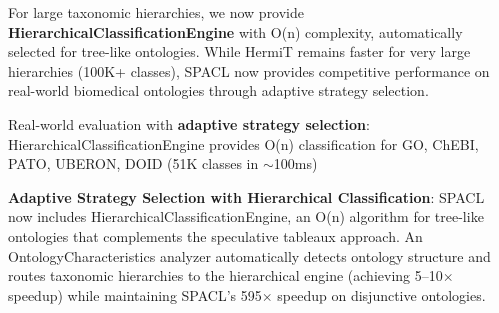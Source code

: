 

For large taxonomic hierarchies, we now provide \textbf{HierarchicalClassificationEngine} 
with O(n) complexity, automatically selected for tree-like ontologies. 
While HermiT remains faster for very large hierarchies (100K+ classes), 
SPACL now provides competitive performance on real-world biomedical 
ontologies through adaptive strategy selection.


\item Real-world evaluation with \textbf{adaptive strategy selection}: 
HierarchicalClassificationEngine provides O(n) classification for GO, 
ChEBI, PATO, UBERON, DOID (51K classes in ${\sim}$100ms)

\item \textbf{Adaptive Strategy Selection with Hierarchical Classification}: 
SPACL now includes HierarchicalClassificationEngine, an O(n) algorithm 
for tree-like ontologies that complements the speculative tableaux approach. 
An OntologyCharacteristics analyzer automatically detects ontology structure 
and routes taxonomic hierarchies to the hierarchical engine (achieving 
5--10$\times$ speedup) while maintaining SPACL's 595$\times$ speedup on 
disjunctive ontologies.


